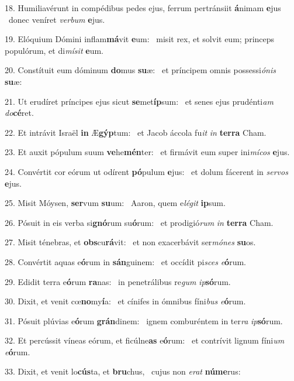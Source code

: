 18. Humiliavérunt in compédibus pedes ejus, ferrum pertránsiit \textbf{á}nimam \textbf{e}jus \ast\  donec veníret \textit{ver}\textit{bum} \textbf{e}jus.\

19. Elóquium Dómini inflam\textbf{má}vit \textbf{e}um: \ast\  misit rex, et solvit eum; princeps populórum, et di\textit{mí}\textit{sit} \textbf{e}um.\

20. Constítuit eum dóminum \textbf{do}mus \textbf{su}æ: \ast\  et príncipem omnis possessi\textit{ó}\textit{nis} \textbf{su}æ:\

21. Ut erudíret príncipes ejus sicut \textbf{se}met\textbf{íp}sum: \ast\  et senes ejus prudénti\textit{am} \textit{do}\textbf{cé}ret.\

22. Et intrávit Israël \textbf{in} Æ\textbf{gýp}tum: \ast\  et Jacob áccola fu\textit{it} \textit{in} \textbf{ter}\textbf{ra} Cham.\

23. Et auxit pópulum suum \textbf{ve}he\textbf{mén}ter: \ast\  et firmávit eum super ini\textit{mí}\textit{cos} \textbf{e}jus.\

24. Convértit cor eórum ut odírent \textbf{pó}pulum \textbf{e}jus: \ast\  et dolum fácerent in \textit{ser}\textit{vos} \textbf{e}jus.\

25. Misit Móysen, \textbf{ser}vum \textbf{su}um: \ast\  Aaron, quem e\textit{lé}\textit{git} \textbf{ip}sum.\

26. Pósuit in eis verba si\textbf{gnó}rum su\textbf{ó}rum: \ast\  et prodigió\textit{rum} \textit{in} \textbf{ter}\textbf{ra} Cham.\

27. Misit ténebras, et \textbf{obs}cu\textbf{rá}vit: \ast\  et non exacerbávit ser\textit{mó}\textit{nes} \textbf{su}os.\

28. Convértit aquas e\textbf{ó}rum in \textbf{sán}guinem: \ast\  et occídit pi\textit{sces} \textit{e}\textbf{ó}rum.\

29. Edidit terra e\textbf{ó}rum \textbf{ra}nas: \ast\  in penetrálibus re\textit{gum} \textit{ip}\textbf{só}rum.\

30. Dixit, et venit cœ\textbf{no}my\textbf{í}a: \ast\  et cínifes in ómnibus fíni\textit{bus} \textit{e}\textbf{ó}rum.\

31. Pósuit plúvias e\textbf{ó}rum \textbf{grán}dinem: \ast\  ignem comburéntem in ter\textit{ra} \textit{ip}\textbf{só}rum.\

32. Et percússit víneas eórum, et ficúlne\textbf{as} e\textbf{ó}rum: \ast\  et contrívit lignum fíni\textit{um} \textit{e}\textbf{ó}rum.\

33. Dixit, et venit lo\textbf{cús}ta, et \textbf{bru}chus, \ast\  cujus non \textit{e}\textit{rat} \textbf{nú}\textbf{me}rus:\

